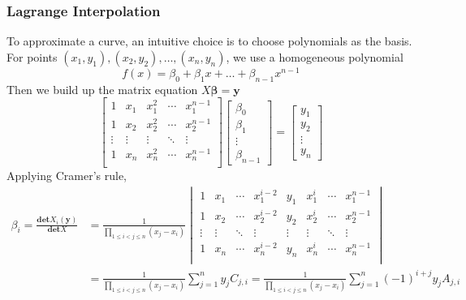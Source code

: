 \documentclass[11pt]{article}
\begin{document}
\subsubsection{Lagrange Interpolation}
To approximate a curve, an intuitive choice is to choose polynomials as the basis. For points $(x_1,y_1),(x_2,y_2),\dots,(x_n,y_n)$, we use a homogeneous polynomial
\begin{equation}
    f(x) = \beta_0 + \beta_1x + \dots + \beta_{n-1}x^{n-1}
\end{equation}
Then we build up the matrix equation $X\bm{\beta} = \bm{y}$
\begin{equation}
    \begin{bmatrix}
    1 & x_1 & x_1^2 & \cdots & x_1^{n-1} \\
    1 & x_2 & x_2^2 & \cdots & x_2^{n-1} \\
    \vdots & \vdots & \vdots & \ddots & \vdots \\
    1 & x_n & x_n^2 & \cdots & x_n^{n-1} \\
    \end{bmatrix} \begin{bmatrix}
    \beta_0 \\ \beta_1 \\ \vdots \\ \beta_{n-1}
    \end{bmatrix} = \begin{bmatrix}
    y_1 \\ y_2 \\ \vdots \\ y_n
    \end{bmatrix}
\end{equation}
Applying Cramer's rule,
\begin{equation}
\begin{aligned}
    \beta_i = \frac{\bm{det}X_i(\bm{y})}{\bm{det}X} &= \frac{1}{\prod_{1 \leq i < j \leq n}(x_j - x_i)}\begin{vmatrix}
    1 & x_1 & \cdots & x_1^{i-2} & y_1 & x_1^{i} & \cdots & x_1^{n-1} \\
    1 & x_2 & \cdots & x_2^{i-2} & y_2 & x_2^{i} & \cdots & x_2^{n-1} \\
    \vdots & \vdots & \ddots & \vdots & \vdots & \vdots & \ddots & \vdots \\
    1 & x_n & \cdots & x_n^{i-2} & y_n & x_n^{i} & \cdots & x_n^{n-1} \\
    \end{vmatrix} \\
    &= \frac{1}{\prod_{1 \leq i < j \leq n}(x_j - x_i)} \sum_{j=1}^{n}y_j C_{j,i} = \frac{1}{\prod_{1 \leq i < j \leq n}(x_j - x_i)} \sum_{j=1}^{n}(-1)^{i+j}y_j A_{j,i}
\end{aligned}
\end{equation}
\end{document}
